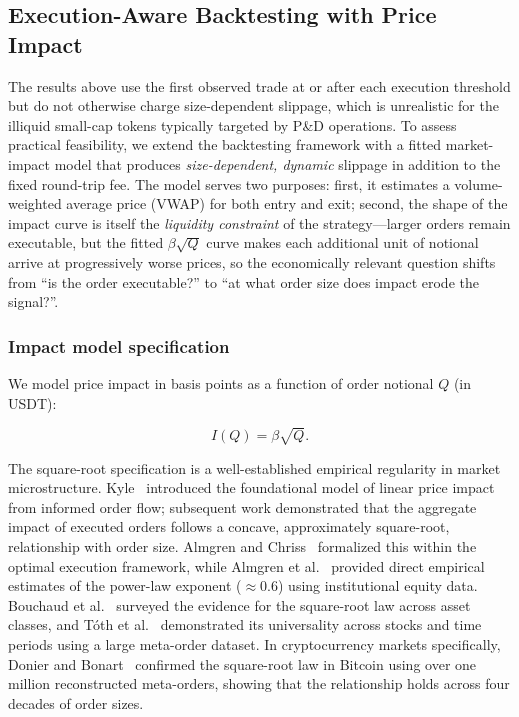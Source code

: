 \documentclass{ieeeaccess}
\begin{document}
\subsection{Execution-Aware Backtesting with Price Impact}
\label{sec:price_impact}

The results above use the first observed trade at or after each execution threshold but do not otherwise charge size-dependent slippage, which is unrealistic for the illiquid small-cap tokens typically targeted by P\&D operations. To assess practical feasibility, we extend the backtesting framework with a fitted market-impact model that produces \emph{size-dependent, dynamic} slippage in addition to the fixed round-trip fee. The model serves two purposes: first, it estimates a volume-weighted average price (VWAP) for both entry and exit; second, the shape of the impact curve is itself the \emph{liquidity constraint} of the strategy---larger orders remain executable, but the fitted $\beta\sqrt{Q}$ curve makes each additional unit of notional arrive at progressively worse prices, so the economically relevant question shifts from ``is the order executable?'' to ``at what order size does impact erode the signal?''.

\subsubsection{Impact model specification}
We model price impact in basis points as a function of order notional $Q$ (in USDT):

\begin{equation}
    I(Q) = \beta \sqrt{Q}.
    \label{eq:impact_model}
\end{equation}

The square-root specification is a well-established empirical regularity in market microstructure. Kyle~\cite{kyle1985continuous} introduced the foundational model of linear price impact from informed order flow; subsequent work demonstrated that the aggregate impact of executed orders follows a concave, approximately square-root, relationship with order size. Almgren and Chriss~\cite{almgren2001optimal} formalized this within the optimal execution framework, while Almgren et al.~\cite{almgren2005direct} provided direct empirical estimates of the power-law exponent ($\approx 0.6$) using institutional equity data. Bouchaud et al.~\cite{bouchaud2009markets} surveyed the evidence for the square-root law across asset classes, and T\'{o}th et al.~\cite{toth2011anomalous} demonstrated its universality across stocks and time periods using a large meta-order dataset. In cryptocurrency markets specifically, Donier and Bonart~\cite{donier2015million} confirmed the square-root law in Bitcoin using over one million reconstructed meta-orders, showing that the relationship holds across four decades of order sizes.
\end{document}
